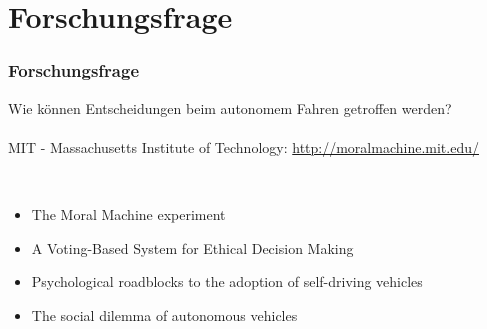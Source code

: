 \section{Forschungsfrage}

\begin{frame}
    \frametitle{Forschungsfrage}

    Wie können Entscheidungen beim autonomem Fahren getroffen werden? \\
    \\ \pause
    MIT - Massachusetts Institute of Technology: \url{http://moralmachine.mit.edu/} \pause
    
    \\

    \begin{itemize}
        \item The Moral Machine experiment \cite{Awad2018}
        \item A Voting-Based System for Ethical Decision Making \cite{DBLP:journals/corr/abs-1709-06692}
        \item Psychological roadblocks to the adoption of self-driving vehicles \cite{Shariff2017}
        \item The social dilemma of autonomous vehicles \cite{Bonnefon1573}
    \end{itemize}
\end{frame}
